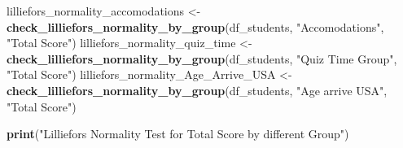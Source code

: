 \documentclass[
]{article}
\newenvironment{Shaded}{\begin{snugshade}}{\end{snugshade}}
\newcommand{\AttributeTok}[1]{\textcolor[rgb]{0.13,0.29,0.53}{#1}}
\newcommand{\CommentTok}[1]{\textcolor[rgb]{0.56,0.35,0.01}{\textit{#1}}}
\newcommand{\ConstantTok}[1]{\textcolor[rgb]{0.56,0.35,0.01}{#1}}
\newcommand{\ControlFlowTok}[1]{\textcolor[rgb]{0.13,0.29,0.53}{\textbf{#1}}}
\newcommand{\DecValTok}[1]{\textcolor[rgb]{0.00,0.00,0.81}{#1}}
\newcommand{\FunctionTok}[1]{\textcolor[rgb]{0.13,0.29,0.53}{\textbf{#1}}}
\newcommand{\NormalTok}[1]{#1}
\newcommand{\OtherTok}[1]{\textcolor[rgb]{0.56,0.35,0.01}{#1}}
\newcommand{\SpecialCharTok}[1]{\textcolor[rgb]{0.81,0.36,0.00}{\textbf{#1}}}
\newcommand{\StringTok}[1]{\textcolor[rgb]{0.31,0.60,0.02}{#1}}
\begin{document}
\begin{Shaded}
\end{Shaded}

\begin{Shaded}
\begin{Highlighting}[]
\NormalTok{lilliefors\_normality\_accomodations }\OtherTok{\textless{}{-}} \FunctionTok{check\_lilliefors\_normality\_by\_group}\NormalTok{(df\_students, }\StringTok{"Accomodations"}\NormalTok{, }\StringTok{"Total Score"}\NormalTok{)}
\NormalTok{lilliefors\_normality\_quiz\_time }\OtherTok{\textless{}{-}} \FunctionTok{check\_lilliefors\_normality\_by\_group}\NormalTok{(df\_students, }\StringTok{"Quiz Time Group"}\NormalTok{, }\StringTok{"Total Score"}\NormalTok{)}
\NormalTok{lilliefors\_normality\_Age\_Arrive\_USA }\OtherTok{\textless{}{-}} \FunctionTok{check\_lilliefors\_normality\_by\_group}\NormalTok{(df\_students, }\StringTok{"Age arrive USA"}\NormalTok{, }\StringTok{"Total Score"}\NormalTok{)}


\FunctionTok{print}\NormalTok{(}\StringTok{"Lilliefors Normality Test for Total Score by different Group"}\NormalTok{)}
\end{Highlighting}
\end{Shaded}
\end{document}

